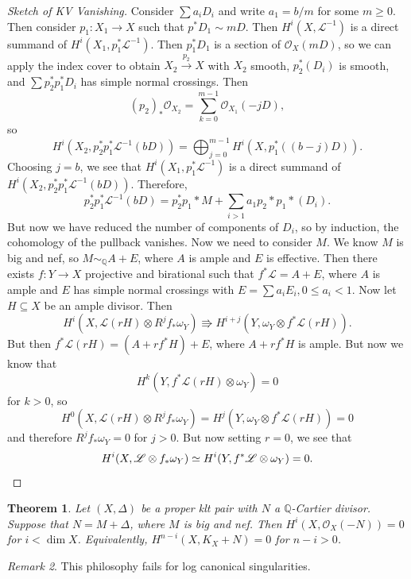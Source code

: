 \documentclass[leqno, openany]{memoir}
\newtheorem{thm}{Theorem}[section]
\theoremstyle{definition}
\theoremstyle{remark}
\newtheorem{rmk}[thm]{Remark}
\theoremstyle{plain}
\theoremstyle{definition}
\theoremstyle{remark}
\newcommand{\Q}{\mathbb{Q}}
\newcommand{\msc}[1]{\mathscr{#1}}
\begin{document}
\begin{proof}[Sketch of KV Vanishing]
    Consider $\sum a_i D_i$ and write $a_1 = b/m$ for some $m \geq 0$. Then consider $p_1 \colon X_1 \to X$ such that $p^* D_1 \sim m D$. Then $H^i(X, \msc{L}^{-1})$ is a direct summand of $H^i(X_1, p_1^* \msc{L}^{-1})$. Then $p_1^* D_1$ is a section of $\msc{O}_X(mD)$, so we can apply the index cover to obtain $X_2 \xrightarrow{p_2} X$ with $X_2$ smooth, $p_2^* (D_i)$ is smooth, and $\sum p_2^* p_1^* D_i$ has simple normal crossings. Then
    \[ {(p_2)}_* \msc{O}_{X_2} = \sum_{k=0}^{m-1} \msc{O}_{X_1}(-j D), \]
    so
    \[ H^i(X_2, p_2^* p_1^* \msc{L}^{-1}(b D)) = \bigoplus_{j=0}^{m-1} H^i(X, p_1^* ((b-j)D)). \]
    Choosing $j = b$, we see that $H^i(X_1, p_1^* \msc{L}^{-1})$ is a direct summand of $H^i(X_2, p_2^* p_1^* \msc{L}^{-1}(bD))$. Therefore, 
    \[ p_2^* p_1^* \msc{L}^{-1}(bD) = p_2^* p_1* M + \sum_{i > 1} a_1 p_2* p_1* (D_i). \]
    But now we have reduced the number of components of $D_i$, so by induction, the cohomology of the pullback vanishes. Now we need to consider $M$. We know $M$ is big and nef, so $M \sim_{\Q} A + E$, where $A$ is ample and $E$ is effective. Then there exists $f \colon Y \to X$ projective and birational such that $f^* \msc{L} = A + E$, where $A$ is ample and $E$ has simple normal crossings with $E = \sum a_i E_i, 0 \leq a_i < 1$. Now let $H \subseteq X$ be an ample divisor. Then
    \[ H^i(X, \msc{L}(rH) \otimes R^j f_* \omega_Y) \Rrightarrow H^{i+j}(Y, \omega_Y \otimes f^* \msc{L}(rH)). \]
    But then $f^* \msc{L}(rH) = (A + r f^* H) + E$, where $A + rf^* H$ is ample. But now we know that
    \[ H^k(Y, f^* \msc{L}(rH) \otimes \omega_Y) = 0 \]
    for $k > 0$, so 
    \[ H^0(X, \msc{L}(rH) \otimes R^j f_* \omega_Y) = H^j(Y, \omega_Y \otimes f^* \msc{L}(rH)) = 0 \]
    and therefore $R^j f_* \omega_Y = 0$ for $j > 0$. But now setting $r = 0$, we see that
    \[ H^i(X, \msc{L} \otimes f_* \omega_Y) \simeq H^i(Y, f^* \msc{L} \otimes \omega_Y) = 0. \qedhere \]
\end{proof}

\begin{thm}
    Let $(X, \Delta)$ be a proper klt pair with $N$ a $\Q$-Cartier divisor. Suppose that $N = M + \Delta$, where $M$ is big and nef. Then $H^i(X, \msc{O}_X(-N)) = 0$ for $i < \dim X$. Equivalently, $H^{n-i}(X, K_X + N) = 0$ for $n-i > 0$.
\end{thm}

\begin{rmk}
    This philosophy fails for log canonical singularities.
\end{rmk}
\end{document}
